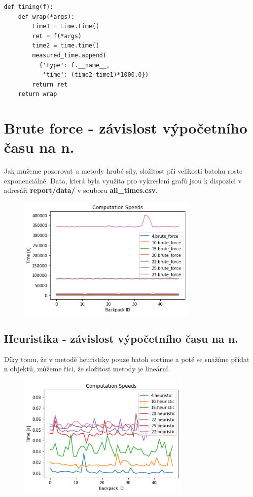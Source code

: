 \documentclass[a4paper,10pt,twocolumn]{article}
\begin{document}
   \begin{verbatim}
def timing(f):
    def wrap(*args):
        time1 = time.time()
        ret = f(*args)
        time2 = time.time()
        measured_time.append(
          {'type': f.__name__,
           'time': (time2-time1)*1000.0})
        return ret
    return wrap
   \end{verbatim}

\section{Brute force - závislost výpočetního času na n.}

Jak můžeme pozorovat u metody hrubé síly, složitost při velikosti batohu roste exponenciálně. Data, která byla využita pro vykreslení grafů jsou k dispozici v adresáři \textbf{report/data/} v souboru \textbf{all\_times.csv}.

\begin{figure}[H]
  \begin{center}
    \includegraphics[height=6cm]{graphs/brute_force_speeds.png}
  \end{center}
\end{figure}

\subsection{Heuristika - závislost výpočetního času na n.}

Díky tomu, že v metodě heuristiky pouze batoh sortíme a poté se snažíme přidat n objektů, můžeme říci, že složitost metody je lineární.

\begin{figure}[H]
  \begin{center}
    \includegraphics[height=6cm]{graphs/heuristic_speeds.png}
  \end{center}
\end{figure}
\end{document}
